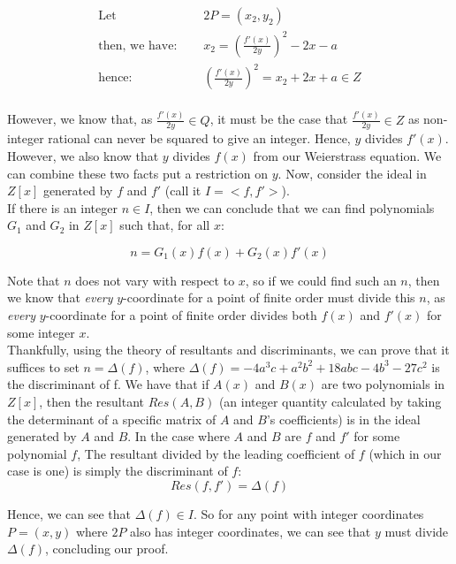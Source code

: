 \documentclass{article}
\begin{document}
\begin{align*}
    \text{Let } \quad & 2P = (x_2, y_2)\\
    \text{then, we have: } \quad & x_2 = \left( \frac{f'(x)}{2y} \right) ^2 - 2x - a\\
    \text{hence: } \quad & \left( \frac{f'(x)}{2y} \right) ^2 = x_2 + 2x + a \in Z\\
\end{align*}

However, we know that, as $\frac{f'(x)}{2y} \in Q$, it must be the case that $\frac{f'(x)}{2y} \in Z$ as non-integer rational can never be squared to give an integer. Hence, $y$ divides $f'(x)$. However, we also know that $y$ divides $f(x)$ from our Weierstrass equation. We can combine these two facts put a restriction on $y$. Now, consider the ideal in $Z[x]$ generated by $f$ and $f'$ (call it $I = <f, f'>$).\\

If there is an integer $n \in I$, then we can conclude that we can find polynomials $G_1$ and $G_2$ in $Z[x]$ such that, for all $x$:

\[ n = G_1(x)f(x) + G_2(x)f'(x) \]

Note that $n$ does not vary with respect to $x$, so if we could find such an $n$, then we know that \emph{every} $y$-coordinate for a point of finite order must divide this $n$, as \emph{every} $y$-coordinate for a point of finite order divides both $f(x)$ and $f'(x)$ for some integer $x$.\\

Thankfully, using the theory of resultants and discriminants, we can prove that it suffices to set $n = \Delta(f)$, where $\Delta(f) = -4a^3c + a^2b^2 + 18abc - 4b^3 - 27c^2$ is the discriminant of f. We have that if $A(x)$ and $B(x)$ are two polynomials in $Z[x]$, then the resultant $Res(A, B)$ (an integer quantity calculated by taking the determinant of a specific matrix of $A$ and $B$'s coefficients) is in the ideal generated by $A$ and $B$. In the case where $A$ and $B$ are $f$ and $f'$ for some polynomial $f$, The resultant divided by the leading coefficient of $f$ (which in our case is one) is simply the discriminant of $f$: \\

\[ Res(f, f') = \Delta(f) \]

Hence, we can see that $\Delta(f) \in I$. So for any point with integer coordinates $P = (x, y)$ where $2P$ also has integer coordinates, we can see that $y$ must divide $\Delta(f)$, concluding our proof.
\end{document}

